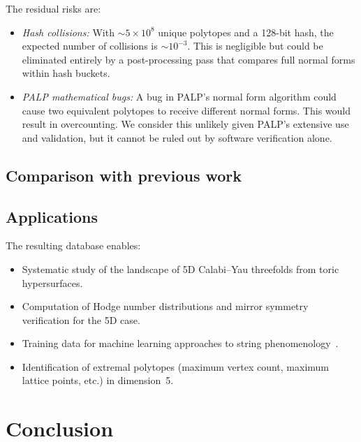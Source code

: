 \documentclass[12pt,a4paper]{article}
\theoremstyle{definition}
\begin{document}
The residual risks are:
\begin{itemize}
  \item \emph{Hash collisions:} With $\sim 5 \times 10^8$ unique polytopes
        and a 128-bit hash, the expected number of collisions is $\sim
        10^{-3}$.  This is negligible but could be eliminated entirely by
        a post-processing pass that compares full normal forms within hash
        buckets.
  \item \emph{PALP mathematical bugs:} A bug in PALP's normal form
        algorithm could cause two equivalent polytopes to receive different
        normal forms.  This would result in overcounting.  We consider this
        unlikely given PALP's extensive use and validation, but it cannot
        be ruled out by software verification alone.
\end{itemize}

\subsection{Comparison with previous work}


\subsection{Applications}

The resulting database enables:
\begin{itemize}
  \item Systematic study of the landscape of 5D Calabi--Yau threefolds
        from toric hypersurfaces.
  \item Computation of Hodge number distributions and mirror symmetry
        verification for the 5D case.
  \item Training data for machine learning approaches to string
        phenomenology~\cite{He2017}.
  \item Identification of extremal polytopes (maximum vertex count, maximum
        lattice points, etc.) in dimension~5.
\end{itemize}

\section{Conclusion}
\label{sec:conclusion}
\end{document}
